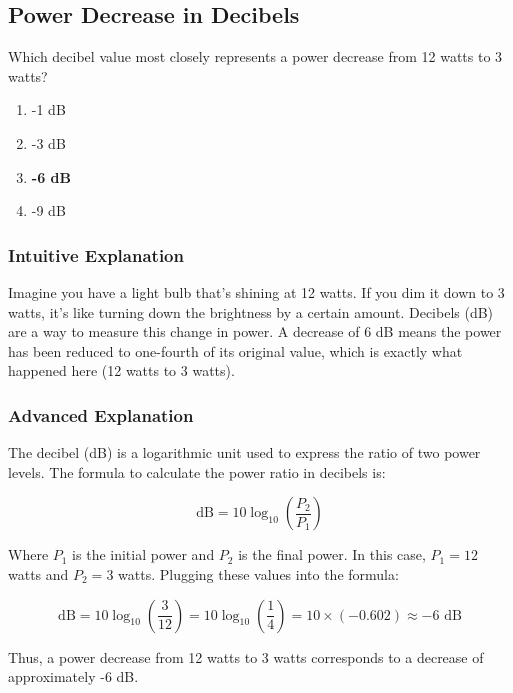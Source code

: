\subsection{Power Decrease in Decibels}
\label{T5B10}

\begin{tcolorbox}[colback=gray!10!white,colframe=black!75!black,title=T5B10]
Which decibel value most closely represents a power decrease from 12 watts to 3 watts?
\begin{enumerate}[noitemsep]
    \item -1 dB
    \item -3 dB
    \item \textbf{-6 dB}
    \item -9 dB
\end{enumerate}
\end{tcolorbox}

\subsubsection*{Intuitive Explanation}
Imagine you have a light bulb that's shining at 12 watts. If you dim it down to 3 watts, it's like turning down the brightness by a certain amount. Decibels (dB) are a way to measure this change in power. A decrease of 6 dB means the power has been reduced to one-fourth of its original value, which is exactly what happened here (12 watts to 3 watts).

\subsubsection*{Advanced Explanation}
The decibel (dB) is a logarithmic unit used to express the ratio of two power levels. The formula to calculate the power ratio in decibels is:

\[
\text{dB} = 10 \log_{10}\left(\frac{P_2}{P_1}\right)
\]

Where \(P_1\) is the initial power and \(P_2\) is the final power. In this case, \(P_1 = 12\) watts and \(P_2 = 3\) watts. Plugging these values into the formula:

\[
\text{dB} = 10 \log_{10}\left(\frac{3}{12}\right) = 10 \log_{10}\left(\frac{1}{4}\right) = 10 \times (-0.602) \approx -6 \text{ dB}
\]

Thus, a power decrease from 12 watts to 3 watts corresponds to a decrease of approximately -6 dB.